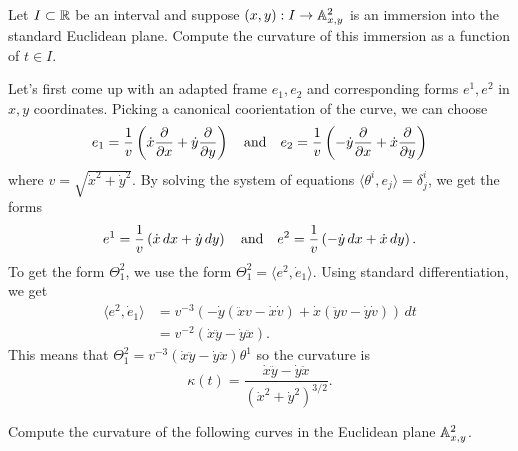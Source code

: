 \documentclass{../../templates/lkx_pset}
\begin{document}
\begin{problem}{3}
Let $I\subset \mathbb{R}$ be an interval and suppose $(x,y) : I \to \mathbb{A}^2_{x,y}$ is an immersion into the standard Euclidean plane. Compute the curvature of this immersion as a function of $t\in I$.
\end{problem}

Let's first come up with an adapted frame $e_1,e_2$ and corresponding forms $e^1,e^2$ in $x,y$ coordinates. Picking a canonical coorientation of the curve, we can choose
\[
	e_1 = \frac{1}{v}\left(\dot{x}\frac{\partial }{\partial x} + \dot{y}\frac{\partial }{\partial y}\right)\quad\textrm{and}\quad e_2 =
	\frac{1}{v}\left(
	-\dot{y}\frac{\partial }{\partial x} + \dot{x}\frac{\partial }{\partial y}\right)
\]
where $v=\sqrt{\dot{x}^2+\dot{y}^2}$. By solving the system of equations $\langle \theta^i, e_j\rangle = \delta^i_j$, we get the forms
\[
  e^1 = \frac{1}{v}\left(\dot{x}\,dx + \dot{y}\,dy\right)
  \quad\textrm{and}\quad
  e^2 = \frac{1}{v}\left(-\dot{y}\,dx + \dot{x}\,dy\right).
\]
To get the form $\Theta^2_1$, we use the form $\Theta^2_1=\langle e^2, \dot{e}_1\rangle$. Using standard differentiation, we get
\[
  \begin{aligned}
    \langle e^2,\dot{e}_1\rangle 
    &= v^{-3}(-\dot{y}(\ddot{x}v-\dot{x}\dot{v}) + \dot{x}(\ddot{y}v-\dot{y}\dot{v}))\,dt\\
    &= v^{-2}(\dot{x}\ddot{y}-\dot{y}\ddot{x}).
  \end{aligned}
\]
This means that $\Theta^2_1 = v^{-3}(\dot{x}\ddot{y}-\dot{y}\ddot{x}) \theta^1$ so the curvature is
\[
    \kappa(t) = \frac{\dot{x}\ddot{y} - \dot{y}\ddot{x}}{(\dot{x}^2+\dot{y}^2)^{3/2}}.
\]

\pagebreak
\begin{problem}{4}
  Compute the curvature of the following curves in the Euclidean plane $\mathbb{A}^2_{x,y}$.
\end{problem}
\end{document}
